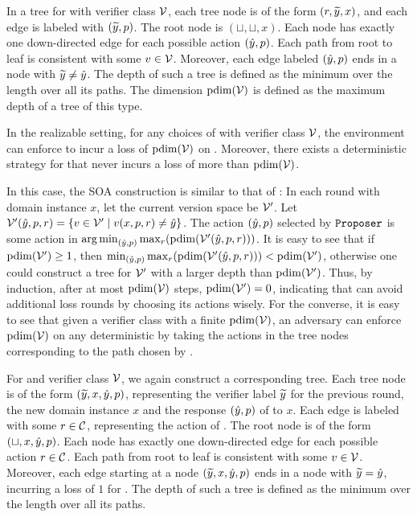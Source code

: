 \documentclass[11pt,letterpaper]{article}
\theoremstyle{definition}
\theoremstyle{plain}
\DeclareMathOperator*{\argmin}{arg\,min}
\begin{document}
In a tree for \dt with verifier class ${\mathcal V}$, each tree node is of the form $({r},{\widetilde{y}},x)$, and each edge is labeled with $({\widetilde{y}}, {p})$. The root node is $(\sqcup,\sqcup,x)$. Each node has exactly one down-directed edge for each possible \dt action $({\hat{y}}, {p})$. Each path from root to leaf is consistent with some $v \in {\mathcal V}$. Moreover, each edge labeled $({\hat{y}}, {p})$ ends in a node with ${\widetilde{y}} \neq {\hat{y}}$. The depth of such a tree is defined as the minimum over the length over all its paths. The dimension $\mathrm{{p} dim}({\mathcal V})$ is defined as the maximum depth of a tree of this type. 

\begin{claim}
    In the realizable setting, for any  choices of \dt with verifier class ${\mathcal V}$, the environment can enforce \dt to incur a loss of $\mathrm{{p} dim}({\mathcal V})$ on \dt. Moreover, there exists a deterministic strategy for \dt that never incurs a loss of more than $\mathrm{{p} dim}({\mathcal V})$.
\end{claim}
In this case, the SOA construction is similar to that of \cite{oz2026discriminative}: In each round with domain instance $x$, let the current version space be ${\mathcal V}'$. Let 
${\mathcal V}'({\hat{y}},{p},{r}) = \{v \in {\mathcal V}' \mid v(x,{p},{r}) \neq {\hat{y}}\}$. 
The action $({\hat{y}},{p})$ selected by $\texttt{Proposer}$ is some action in   
$\argmin_{(\hy,\ct)} \max_{\cf}(\ctd(\V'(\hy,\ct,\cf)))$. It is easy to see that if $\mathrm{{p} dim}({\mathcal V}') \geq 1$, then $\min_{({\hat{y}},{p})} \max_{{r}}(\mathrm{{p} dim}({\mathcal V}'({\hat{y}},{p},{r}))) < \mathrm{{p} dim}({\mathcal V}')$, otherwise one could construct a \dt tree for ${\mathcal V}'$ with a larger depth than $\mathrm{{p} dim}({\mathcal V}')$. Thus, by induction, after at most $\mathrm{{p} dim}({\mathcal V})$ steps, $\mathrm{{p} dim}({\mathcal V}') = 0$, indicating that \dt can avoid additional loss rounds by choosing its actions wisely. For the converse, it is easy to see that given a verifier class with a finite $\mathrm{{p} dim}({\mathcal V})$, an adversary can enforce $\mathrm{{p} dim}({\mathcal V})$ on any deterministic \dt by taking the actions in the tree nodes corresponding to the path chosen by \dt.


For \df and verifier class ${\mathcal V}$, we again construct a corresponding tree. %
Each tree node is of the form $({\widetilde{y}},x,{\hat{y}}, {p})$, representing the verifier label ${\widetilde{y}}$ for the previous round, the new domain instance $x$ and the response $({\hat{y}}, {p})$ of \dt to $x$. Each edge is labeled with some ${r} \in {{\mathcal C}}$, representing the action of \df. The root node is of the form $(\sqcup,x,{\hat{y}}, {p})$. Each node has exactly one down-directed edge for each possible \df action ${r} \in {{\mathcal C}}$. Each path from root to leaf is consistent with some $v \in {\mathcal V}$. 
Moreover, each edge starting at a node $({\widetilde{y}},x,{\hat{y}}, {p})$ ends in a node with ${\widetilde{y}} = {\hat{y}}$, incurring a loss of $1$ for \df. The depth of such a tree is defined as the minimum over the length over all its paths. 
\end{document}
